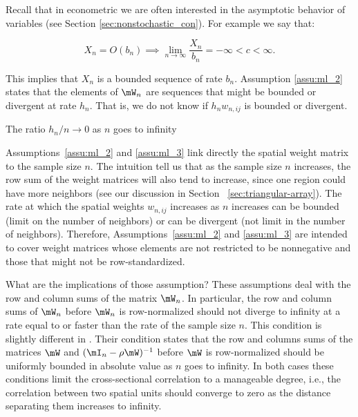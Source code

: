 Recall that in econometric we are often interested in the asymptotic behavior of variables (see Section \ref{sec:nonstochastic_con}). For example we say that:

\begin{equation*}
  X_n = O(b_n) \implies \lim_{n\to \infty}\frac{X_n}{b_n} = -\infty < c < \infty.
\end{equation*}

This implies that $X_n$ is a bounded sequence of rate $b_n$. Assumption \ref{assu:ml_2} states that the elements of $\mW_{n}$ are sequences that might be bounded or divergent at rate $h_n$. That is, we do not know if $h_nw_{n,ij}$ is bounded or divergent.

\begin{assumption}\label{assu:ml_3}
	The ratio $h_n/n \to 0$ as $n$ goes to infinity
\end{assumption}

Assumptions~\ref{assu:ml_2} and \ref{assu:ml_3} link directly the spatial weight matrix to the sample size $n$. The intuition tell us that as the sample size $n$ increases, the row sum of the weight matrices will also tend to increase, since one region could have more neighbors (see our discussion in Section ~\ref{sec:triangular-array}). The rate at which the spatial weights $w_{n,ij}$ increases as $n$ increases can be bounded (limit on the number of neighbors) or can be divergent (not limit in the number of neighbors). Therefore, Assumptions~\ref{assu:ml_2} and \ref{assu:ml_3} are intended to cover weight matrices whose elements are not restricted to be nonnegative and those that might not be row-standardized. 

What are the implications of those assumption? These assumptions deal with the row and column sums of the matrix $\mW_n$. In particular, the row and column sums of $\mW_n$ before $\mW_n$ is row-normalized should not diverge to infinity at a rate equal to or faster than the rate of the sample size $n$. This condition is slightly different in \cite{kelejian1998generalized, kelejian1999generalized}. Their condition states that the row and columns sums of the matrices $\mW$ and $(\mI_n - \rho\mW)^{-1}$ before $\mW$ is row-normalized should be uniformly bounded in absolute value as $n$ goes to infinity. In both cases these conditions limit the cross-sectional correlation to a manageable degree, i.e., the correlation between two spatial units should converge to zero as the distance separating them increases to infinity. 

